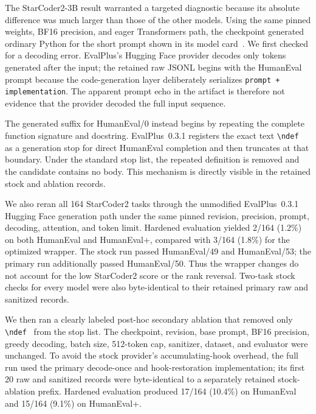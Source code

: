 \documentclass[10pt,twocolumn]{article}
\newcommand{\code}[1]{\texttt{#1}}
\begin{document}
The StarCoder2-3B result warranted a targeted diagnostic because its absolute difference was much larger than those of the other models. Using the same pinned weights, BF16 precision, and eager Transformers path, the checkpoint generated ordinary Python for the short prompt shown in its model card~\citep{bigcode2024starcoder2card}. We first checked for a decoding error. EvalPlus's Hugging Face provider decodes only tokens generated after the input; the retained raw JSONL begins with the HumanEval prompt because the code-generation layer deliberately serializes \code{prompt + implementation}. The apparent prompt echo in the artifact is therefore not evidence that the provider decoded the full input sequence.

The generated suffix for HumanEval/0 instead begins by repeating the complete function signature and docstring. EvalPlus~0.3.1 registers the exact text \code{\textbackslash ndef } as a generation stop for direct HumanEval completion and then truncates at that boundary. Under the standard stop list, the repeated definition is removed and the candidate contains no body. This mechanism is directly visible in the retained stock and ablation records.

We also reran all 164 StarCoder2 tasks through the unmodified EvalPlus~0.3.1 Hugging Face generation path under the same pinned revision, precision, prompt, decoding, attention, and token limit. Hardened evaluation yielded 2/164 (1.2\%) on both HumanEval and HumanEval+, compared with 3/164 (1.8\%) for the optimized wrapper. The stock run passed HumanEval/49 and HumanEval/53; the primary run additionally passed HumanEval/50. Thus the wrapper changes do not account for the low StarCoder2 score or the rank reversal. Two-task stock checks for every model were also byte-identical to their retained primary raw and sanitized records.

We then ran a clearly labeled post-hoc secondary ablation that removed only \code{\textbackslash ndef } from the stop list. The checkpoint, revision, base prompt, BF16 precision, greedy decoding, batch size, 512-token cap, sanitizer, dataset, and evaluator were unchanged. To avoid the stock provider's accumulating-hook overhead, the full run used the primary decode-once and hook-restoration implementation; its first 20 raw and sanitized records were byte-identical to a separately retained stock-ablation prefix. Hardened evaluation produced 17/164 (10.4\%) on HumanEval and 15/164 (9.1\%) on HumanEval+.
\end{document}
